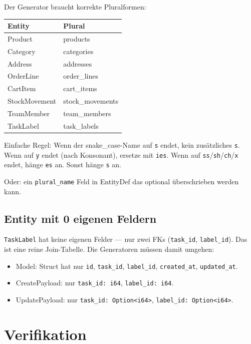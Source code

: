 \documentclass[11pt,a4paper]{article}
\begin{document}
Der Generator braucht korrekte Pluralformen:

\begin{center}
\small
\begin{tabular}{l l}
\toprule
\textbf{Entity} & \textbf{Plural} \\
\midrule
Product & products \\
Category & categories \\
Address & addresses \\
OrderLine & order\_lines \\
CartItem & cart\_items \\
StockMovement & stock\_movements \\
TeamMember & team\_members \\
TaskLabel & task\_labels \\
\bottomrule
\end{tabular}
\end{center}

Einfache Regel: Wenn der snake\_case-Name auf \texttt{s} endet,
kein zus\"atzliches \texttt{s}. Wenn auf \texttt{y} endet (nach
Konsonant), ersetze mit \texttt{ies}. Wenn auf \texttt{ss}/\texttt{sh}/\texttt{ch}/\texttt{x}
endet, h\"ange \texttt{es} an. Sonst h\"ange \texttt{s} an.

Oder: ein \texttt{plural\_name} Feld in EntityDef das optional
\"uberschrieben werden kann.

\subsection{Entity mit 0 eigenen Feldern}

\texttt{TaskLabel} hat keine eigenen Felder --- nur zwei FKs
(\texttt{task\_id}, \texttt{label\_id}). Das ist eine reine
Join-Tabelle. Die Generatoren m\"ussen damit umgehen:

\begin{itemize}[nosep]
\item Model: Struct hat nur \texttt{id}, \texttt{task\_id},
      \texttt{label\_id}, \texttt{created\_at}, \texttt{updated\_at}.
\item CreatePayload: nur \texttt{task\_id: i64}, \texttt{label\_id: i64}.
\item UpdatePayload: nur \texttt{task\_id: Option<i64>},
      \texttt{label\_id: Option<i64>}.
\end{itemize}

\section{Verifikation}
\end{document}
